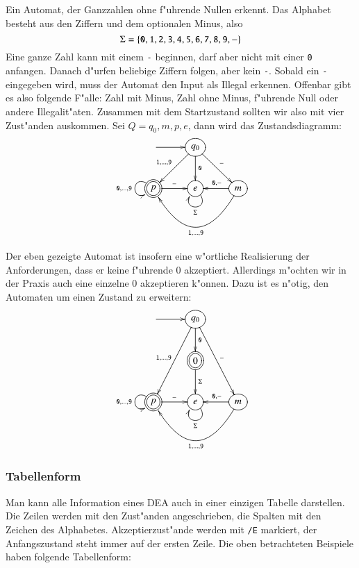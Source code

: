 \begin{beispiel}[\bf Ganzzahlen]
Ein Automat, der Ganzzahlen ohne f"uhrende Nullen erkennt.
Das Alphabet besteht aus den Ziffern und dem optionalen Minus, also
\[
\Sigma=\{
{\tt 0},
{\tt 1},
{\tt 2},
{\tt 3},
{\tt 4},
{\tt 5},
{\tt 6},
{\tt 7},
{\tt 8},
{\tt 9},
{\tt -}
\}
\]
Eine ganze Zahl kann mit einem {\tt -} beginnen, darf
aber nicht mit einer {\tt 0} anfangen. Danach d"urfen beliebige
Ziffern folgen, aber kein {\tt -}. Sobald ein {\tt -} eingegeben
wird, muss der Automat den Input als Illegal erkennen. Offenbar
gibt es also folgende F"alle: Zahl mit Minus, Zahl ohne Minus,
f"uhrende Null oder andere Illegalit"aten. Zusammen mit dem
Startzustand sollten wir also mit vier Zust"anden auskommen.
Sei $Q={q_0, m,p,e}$, dann wird das Zustandsdiagramm:
\[
\entrymodifiers={++[o][F]}
\xymatrix{
*+\txt{}\ar[r]
	&{q_0}  \ar[dl]_{{\tt 1},\dots,{\tt 9}} \ar[d]^{\tt 0} \ar[dr]^{\tt -}
\\
*++[o][F=]{p}\ar[r]^{\tt -} \ar@(ul,dl)_{{\tt 0},\dots,{\tt 9}}
	&{e} \ar@(dr,dl)^{\Sigma}
		&{m}\ar[l]_{{\tt 0},{\tt -}} \ar@/^40pt/[ll]^{{\tt 1},\dots,{\tt 9}}
}
\]
\end{beispiel}
\begin{beispiel}
Der eben gezeigte Automat ist insofern eine w"ortliche Realisierung
der Anforderungen, dass er keine f"uhrende $0$ akzeptiert. Allerdings
m"ochten wir in der Praxis auch eine einzelne $0$ akzeptieren k"onnen.
Dazu ist es n"otig, den Automaten um einen Zustand zu erweitern:
\[
\entrymodifiers={++[o][F]}
\xymatrix{
*+\txt{}\ar[r]
	&{q_0}  \ar[ddl]_{{\tt 1},\dots,{\tt 9}} \ar[d]^{\tt 0} \ar[ddr]^{\tt -}
\\
*+\txt{}
	&*++[o][F=]{0}\ar[d]^{\Sigma}
\\
*++[o][F=]{p}\ar[r]^{\tt -} \ar@(ul,dl)_{{\tt 0},\dots,{\tt 9}}
	&{e} \ar@(dr,dl)^{\Sigma}
		&{m}\ar[l]_{{\tt 0},{\tt -}} \ar@/^40pt/[ll]^{{\tt 1},\dots,{\tt 9}}
}
\]
\end{beispiel}

\subsubsection{Tabellenform}
Man kann alle Information eines DEA auch in einer einzigen Tabelle 
darstellen. Die Zeilen werden mit den Zust"anden angeschrieben,
die Spalten mit den Zeichen des Alphabetes. Akzeptierzust"ande werden
mit {\tt /E} markiert, der Anfangszustand steht immer auf der ersten
Zeile. Die oben betrachteten Beispiele haben folgende Tabellenform:

